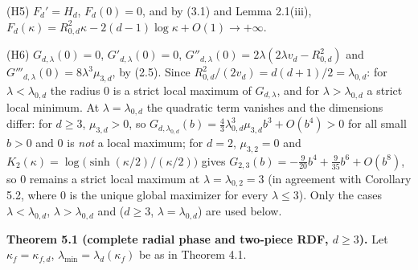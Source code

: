 \documentclass[
  11pt,
  a4paper,
]{article}
\begin{document}
(H5) \(F_d'=H_d\), \(F_d(0)=0\), and by (3.1) and Lemma 2.1(iii),
\(F_d(\kappa)=R_{0,\allowbreak{}d}^2\kappa-2(d-1)\log\kappa+O(1)\to+\infty\).

(H6) \(G_{d,\allowbreak{}\lambda}(0)=0\), \(G'_{d,\allowbreak{}\lambda}(0)=0\),
\(G''_{d,\allowbreak{}\lambda}(0)=2\lambda(2\lambda v_d-R_{0,\allowbreak{}d}^2)\) and
\(G'''_{d,\allowbreak{}\lambda}(0)=8\lambda^3\mu_{3,\allowbreak{}d}\), by (2.5). Since
\(R_{0,\allowbreak{}d}^2/(2v_d)=d(d+1)/2=\lambda_{0,\allowbreak{}d}\): for
\(\lambda<\lambda_{0,\allowbreak{}d}\) the radius \(0\) is a strict local maximum of
\(G_{d,\allowbreak{}\lambda}\), and for \(\lambda>\lambda_{0,\allowbreak{}d}\) a strict local
minimum. At \(\lambda=\lambda_{0,\allowbreak{}d}\) the quadratic term vanishes and
the dimensions differ: for \(d\ge3\), \(\mu_{3,\allowbreak{}d}>0\), so
\(G_{d,\allowbreak{}\lambda_{0,\allowbreak{}d}}(b)=\frac43\lambda_{0,\allowbreak{}d}^3\mu_{3,\allowbreak{}d}b^3+O(b^4)>0\)
for all small \(b>0\) and \(0\) is \emph{not} a local maximum; for
\(d=2\), \(\mu_{3,\allowbreak{}2}=0\) and
\(K_2(\kappa)=\log\big(\sinh(\kappa/2)/(\kappa/2)\big)\) gives
\(G_{2,\allowbreak{}3}(b)=-\frac{9}{20}b^4+\frac{9}{35}b^6+O(b^8)\), so \(0\) remains
a strict local maximum at \(\lambda=\lambda_{0,\allowbreak{}2}=3\) (in agreement with
Corollary 5.2, where \(0\) is the unique global maximizer for every
\(\lambda\le3\)). Only the cases \(\lambda<\lambda_{0,\allowbreak{}d}\),
\(\lambda>\lambda_{0,\allowbreak{}d}\) and (\(d\ge3\), \(\lambda=\lambda_{0,\allowbreak{}d}\)) are
used below.

\textbf{Theorem 5.1 (complete radial phase and two-piece RDF,
\(d\ge3\)).} Let \(\kappa_f=\kappa_{f,\allowbreak{}d}\),
\(\lambda_{\min}=\lambda_d(\kappa_f)\) be as in Theorem 4.1.
\end{document}
